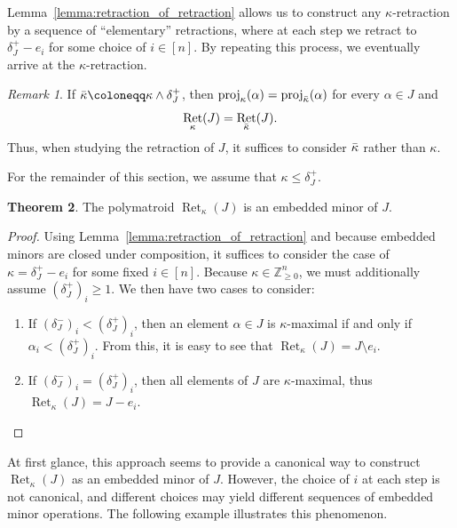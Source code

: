 \documentclass[11pt]{article}
\theoremstyle{definition}
\newtheorem{theorem}{Theorem}[section]
\theoremstyle{remark}
\newtheorem{remark}[theorem]{Remark}
\newcommand{\Zgeqn}{\mathbb{Z}_{\geq 0}^n}     %
\newcommand{\delplus}{\delta_J^+}
\newcommand{\delminus}{\delta_J^-}
\DeclareMathOperator{\proj}{proj}              %
\newcommand{\kproj}{\proj_{\kappa}}            %
\DeclareMathOperator{\Ret}{Ret}                %
\newcommand{\RetK}{\Ret_{\kappa}}              %
\begin{document}
Lemma~\ref{lemma:retraction_of_retraction} allows us to construct any $\kappa$-retraction by a sequence of ``elementary'' retractions, where at each step we retract to $\delplus - e_i$ for some choice of $i \in [n]$. By repeating this process, we eventually arrive at the $\kappa$-retraction.

\begin{remark}\label{remark:kappa_smaller_than_delplus}
    If $\Bar{\kappa}\coloneqq\kappa\wedge\delplus$, then
    $\kproj(\alpha)=\proj_{\Bar{\kappa}}(\alpha)$ for every $\alpha\in J$ and
    \[
        \RetK(J)=\Ret_{\Bar{\kappa}}(J).
    \]
    Thus, when studying the retraction of $J$, it suffices to consider
    $\Bar{\kappa}$ rather than $\kappa$.
\end{remark}

For the remainder of this section, we assume that $\kappa\leq\delplus$.

\begin{theorem} \label{theorem:retraction_is_embedded_minor}
    The polymatroid $\RetK(J)$ is an embedded minor of $J$.
\end{theorem}
\begin{proof}
    Using Lemma~\ref{lemma:retraction_of_retraction} and because embedded minors are closed under composition, it suffices to consider the case of $\kappa = \delplus - e_i$ for some fixed $i \in [n]$. Because $\kappa \in \Zgeqn$, we must additionally assume $(\delplus)_i \geq 1$. We then have two cases to consider:
    \begin{enumerate}[label=\textit{Case \arabic*:}, leftmargin=*, align=left]
        \item If $(\delminus)_i < (\delplus)_i$, then an element $\alpha \in J$ is $\kappa$-maximal if and only if $\alpha_i < (\delplus)_i$. From this, it is easy to see that $\RetK(J) = J \setminus e_i$.
        \item If $(\delminus)_i = (\delplus)_i$, then all elements of $J$ are $\kappa$-maximal, thus $\RetK(J) = J - e_i$.
    \end{enumerate}
\end{proof}
At first glance, this approach seems to provide a canonical way to construct $\RetK(J)$ as an embedded minor of $J$. However, the choice of $i$ at each step is not canonical, and different choices may yield different sequences of embedded minor operations. The following example illustrates this phenomenon.
\end{document}
